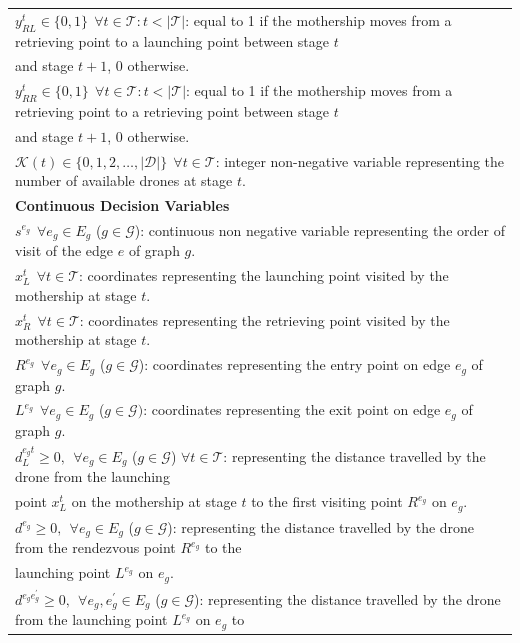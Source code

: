 \begin{table}[h!]
\begin{tabular}{|l|}
$y_{RL}^t \in \{0,1\}  \:\: \forall t \in \mathcal T:t<|\mathcal T|$: equal to 1 if the mothership moves from a retrieving point to a launching point between stage $t$\\ \hspace*{1cm} and stage $t+1$, 0 otherwise.\\
$y_{RR}^t \in \{0,1\}  \:\: \forall t \in \mathcal T:t<|\mathcal T|$: equal to 1 if the mothership moves from a retrieving point to a retrieving point between stage $t$\\ \hspace*{1cm} and stage $t+1$, 0 otherwise.\\
$\mathcal{K}(t) \in \{0, 1, 2, \ldots, |\mathcal D|\}  \:\: \forall t \in \mathcal T$: integer non-negative variable representing the number of available drones at stage $t$.\\
\hline
\textbf{Continuous Decision Variables}\\
\hline
$s^{e_g} \:\: \forall e_g \in E_g$ ($g \in \mathcal{G}$): continuous non negative variable representing the order of visit of the edge $e$ of graph $g$.\\
$x_L^t \:\: \forall t \in \mathcal T$: coordinates representing the launching point visited by the mothership at stage $t$.\\
$x_R^t \:\: \forall t \in \mathcal T$: coordinates representing the retrieving point visited by the mothership at stage $t$.\\
$R^{e_g} \:\: \forall e_g \in E_g$ ($g \in \mathcal{G}$): coordinates representing the entry point on edge $e_g$ of graph $g$.\\
$L^{e_g} \:\: \forall e_g \in E_g$ ($g \in \mathcal{G})$: coordinates representing the exit point on edge $e_g$ of graph $g$.\\
$d_L^{e_g t} \geq 0, \:\: \forall e_g \in E_g$ ($g \in \mathcal{G}$) $\forall t \in \mathcal T$: representing the distance travelled by the drone from the launching\\
\hspace*{1cm} point $x_L^t$ on the mothership at stage $t$ to the first visiting point $R^{e_g}$ on $e_g$.\\
$d^{e_g} \geq 0, \:\: \forall e_g \in E_g$ ($g \in \mathcal{G}$): representing the distance travelled by the drone from the rendezvous point $R^{e_g}$ to the \\
\hspace*{1cm} launching point $L^{e_g}$ on $e_g$. \\
$d^{e_ge^\prime_g} \geq 0, \:\: \forall e_g, e^\prime_g \in E_g $ ($g \in \mathcal{G}$): representing the distance travelled by the drone from the launching point $L^{e_g}$ on $e_g$ to\\

\end{tabular}
\end{table}
